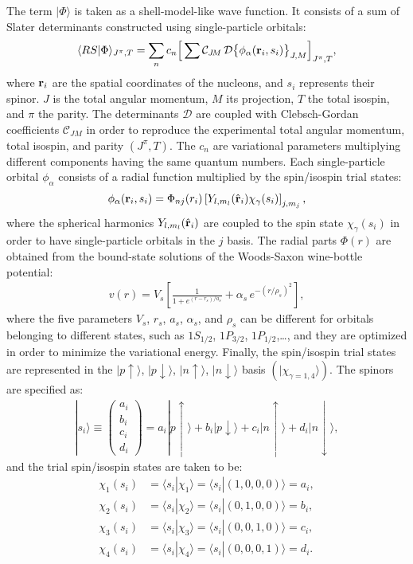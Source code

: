 \documentclass[aps,prc,twocolumn,superscriptaddress,floatfix]{revtex4-1}
\begin{document}
The term $|\Phi\rangle$ is taken as a shell-model-like wave function. 
It consists of a sum of Slater determinants constructed using single-particle orbitals:
\begin{align} 
\langle RS|\Phi\rangle_{J^\pi,T} = \sum_n c_n\Big[\sum \mathcal C_{J\!M}\,\mathcal D\big\{\phi_\alpha(\vb{r}_i,s_i)\big\}_{J,M}\Big]_{J^\pi,T} ,
\end{align}
where $\vb{r}_i$ are the spatial coordinates of the nucleons, and $s_i$ represents their spinor.
$J$ is the total angular momentum, $M$ its projection, $T$ the total isospin, and $\pi$ the parity.
The determinants $\mathcal D$ are coupled with Clebsch-Gordan coefficients $\mathcal C_{J\!M}$ 
in order to reproduce the experimental total angular momentum, total isospin, and parity $(J^\pi,T)$. 
The $c_n$ are variational parameters multiplying different components having the same quantum numbers. 
Each single-particle orbital $\phi_\alpha$ consists of a radial function multiplied by the spin/isospin trial states:
\begin{align}
\phi_\alpha(\vb{r}_i,s_i)=\Phi_{nj}(r_i)\left[Y_{l,m_l}(\hat{\vb{r}}_i)\chi_\gamma(s_i)\right]_{j,m_j} ,
\label{eq:phi}
\end{align}
where the spherical harmonics $Y_{l,m_l}(\hat{\vb{r}}_i)$ are coupled to the spin state $\chi_\gamma(s_i)$
in order to have single-particle orbitals in the $j$ basis.
The radial parts $\Phi(r)$ are obtained from the bound-state solutions of the Woods-Saxon 
wine-bottle potential:
\begin{align}
v(r)=V_s\left[\frac{1}{1+e^{(r-r_s)/a_s}}+\alpha_s\,e^{-(r/{\rho_s})^2}\right] ,
\end{align}
where the five parameters $V_s$, $r_s$, $a_s$, $\alpha_s$, and $\rho_s$ can be different for orbitals
belonging to different states, such as $1S_{1/2}$, $1P_{3/2}$, $1P_{1/2}$,\ldots, and they are 
optimized in order to minimize the variational energy.
Finally, the spin/isospin trial states are represented in the $|p\uparrow\rangle$, $|p\downarrow\rangle$,
$|n\uparrow\rangle$, $|n\downarrow\rangle$ basis $(|\chi_{\gamma=1,4}\rangle)$. 
The spinors are specified as:
\begin{align}
|s_i\rangle \equiv \left(\begin{array}{c} 
a_i \\ b_i \\ c_i \\ d_i
\end{array}\right)
=a_i|p\uparrow\rangle+b_i|p\downarrow\rangle+c_i|n\uparrow\rangle+d_i|n\downarrow\rangle ,
\end{align}
and the trial spin/isospin states are taken to be:
\begin{align}
\chi_1(s_i)&=\langle s_i|\chi_1\rangle=\langle s_i|(1,0,0,0)\rangle=a_i,\nonumber \\
\chi_2(s_i)&=\langle s_i|\chi_2\rangle=\langle s_i|(0,1,0,0)\rangle=b_i,\nonumber \\
\chi_3(s_i)&=\langle s_i|\chi_3\rangle=\langle s_i|(0,0,1,0)\rangle=c_i,\nonumber \\
\chi_4(s_i)&=\langle s_i|\chi_4\rangle=\langle s_i|(0,0,0,1)\rangle=d_i .
\end{align}
\end{document}
